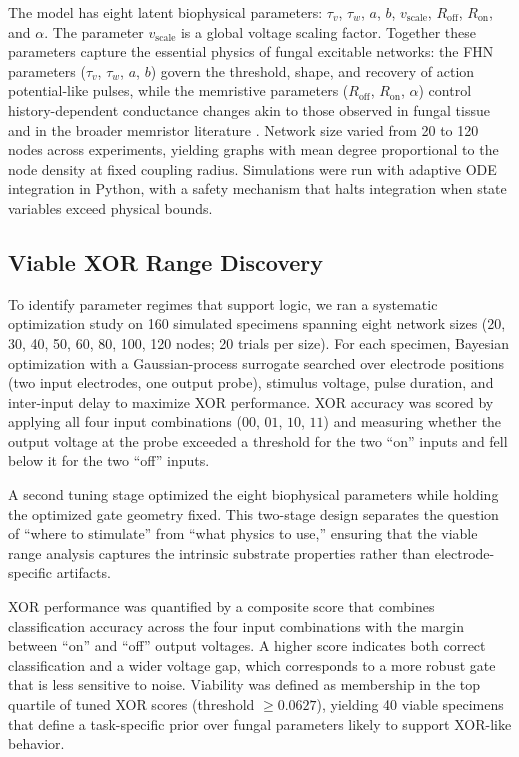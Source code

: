 \documentclass[letterpaper]{article}
\begin{document}
The model has eight latent biophysical parameters: $\tau_v$, $\tau_w$, $a$, $b$, $v_{\text{scale}}$, $R_{\mathrm{off}}$, $R_{\mathrm{on}}$, and $\alpha$. The parameter $v_{\text{scale}}$ is a global voltage scaling factor. Together these parameters capture the essential physics of fungal excitable networks: the FHN parameters ($\tau_v$, $\tau_w$, $a$, $b$) govern the threshold, shape, and recovery of action potential-like pulses, while the memristive parameters ($R_{\mathrm{off}}$, $R_{\mathrm{on}}$, $\alpha$) control history-dependent conductance changes akin to those observed in fungal tissue and in the broader memristor literature \citep{beasley2022mem, chua1971memristor, strukov2008missing}. Network size varied from 20 to 120 nodes across experiments, yielding graphs with mean degree proportional to the node density at fixed coupling radius. Simulations were run with adaptive ODE integration in Python, with a safety mechanism that halts integration when state variables exceed physical bounds.

\subsection{Viable XOR Range Discovery}
To identify parameter regimes that support logic, we ran a systematic optimization study on 160 simulated specimens spanning eight network sizes (20, 30, 40, 50, 60, 80, 100, 120 nodes; 20 trials per size). For each specimen, Bayesian optimization with a Gaussian-process surrogate \citep{snoek2012practical, shahriari2016taking} searched over electrode positions (two input electrodes, one output probe), stimulus voltage, pulse duration, and inter-input delay to maximize XOR performance. XOR accuracy was scored by applying all four input combinations ($00$, $01$, $10$, $11$) and measuring whether the output voltage at the probe exceeded a threshold for the two ``on'' inputs and fell below it for the two ``off'' inputs.

A second tuning stage optimized the eight biophysical parameters while holding the optimized gate geometry fixed. This two-stage design separates the question of ``where to stimulate'' from ``what physics to use,'' ensuring that the viable range analysis captures the intrinsic substrate properties rather than electrode-specific artifacts.

XOR performance was quantified by a composite score that combines classification accuracy across the four input combinations with the margin between ``on'' and ``off'' output voltages. A higher score indicates both correct classification and a wider voltage gap, which corresponds to a more robust gate that is less sensitive to noise. Viability was defined as membership in the top quartile of tuned XOR scores (threshold $\geq 0.0627$), yielding 40 viable specimens that define a task-specific prior over fungal parameters likely to support XOR-like behavior.
\end{document}
